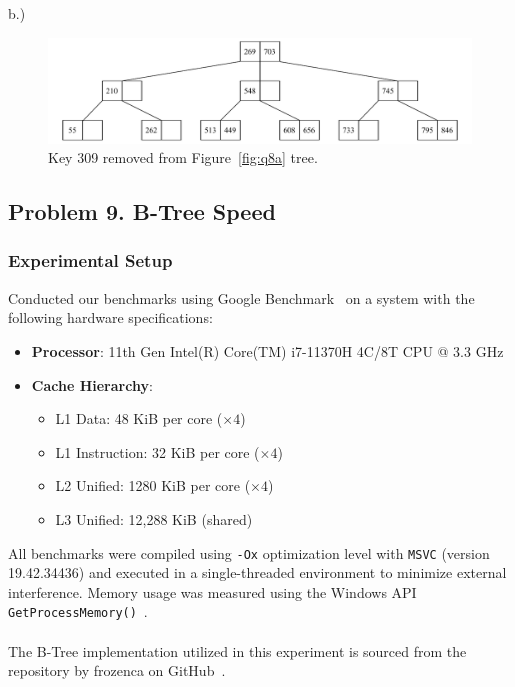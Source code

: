 \documentclass[12pt]{article}
\begin{document}
	
	b.) 
	\begin{figure}[H] 
		\centering
		\includegraphics[width=0.9\linewidth]{Q8_b.drawio}
		\caption{Key 309 removed from Figure~\ref{fig:q8a} tree.}
		\label{fig:q8b}
	\end{figure}
	
	
\vspace{2in} %

\pagebreak
\subsection*{Problem 9. B-Tree Speed}

\subsubsection*{Experimental Setup}
Conducted our benchmarks using Google Benchmark~\cite{google-bench} on a system with the following hardware specifications:

\begin{itemize}
	\small
	\item \textbf{Processor}: 11th Gen Intel(R) Core(TM) i7-11370H 4C/8T CPU @ 3.3 GHz
	\item \textbf{Cache Hierarchy}:
	\begin{itemize}
		\item L1 Data: 48 KiB per core (\(\times 4\))
		\item L1 Instruction: 32 KiB per core (\(\times 4\))
		\item L2 Unified: 1280 KiB per core (\(\times 4\))
		\item L3 Unified: 12,288 KiB (shared)
	\end{itemize}
\end{itemize}

All benchmarks were compiled using \texttt{-Ox} optimization level with \texttt{MSVC} (version 19.42.34436) and executed in a single-threaded environment to minimize external interference. Memory usage was measured using the Windows API \texttt{GetProcessMemory()}~\cite{getprocessmemoryinfo}.\\
\\
The B-Tree implementation utilized in this experiment is sourced from the repository by frozenca
on GitHub~\cite{btree_github}.
\end{document}
